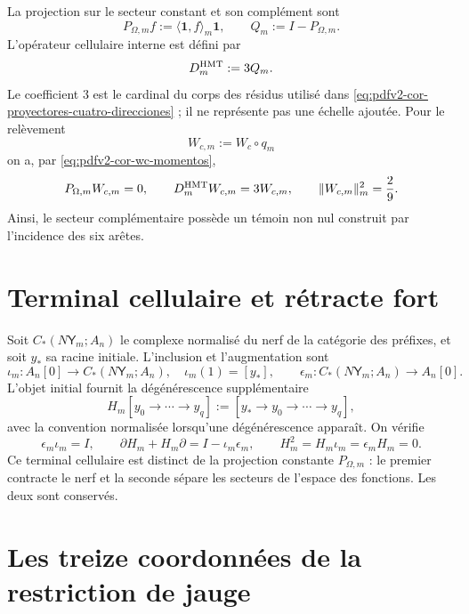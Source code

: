 La projection sur le secteur constant et son complément sont
\begin{equation}\label{eq:gauint-pq}
 P_{\Omega,m}f:=\langle\mathbf1,f\rangle_m\mathbf1,
 \qquad
 Q_m:=I-P_{\Omega,m}.
\end{equation}
L'opérateur cellulaire interne est défini par
\begin{equation}\label{eq:gauint-d-hmt}
 D_m^{\rm HMT}:=3Q_m.
\end{equation}
Le coefficient \(3\) est le cardinal du corps des résidus utilisé dans
\eqref{eq:pdfv2-cor-proyectores-cuatro-direcciones} ; il ne représente pas une
échelle ajoutée.
Pour le relèvement
\[
 W_{c,m}:=W_c\circ q_m
\]
on a, par \eqref{eq:pdfv2-cor-wc-momentos},
\begin{equation}\label{eq:gauint-w-eigen}
 P_{\Omega,m}W_{c,m}=0,
 \qquad
 D_m^{\rm HMT}W_{c,m}=3W_{c,m},
 \qquad
 \|W_{c,m}\|_m^2=\frac29.
\end{equation}
Ainsi, le secteur complémentaire possède un témoin non nul construit par
l'incidence des six arêtes.

\section{Terminal cellulaire et rétracte fort}

Soit \(C_*(N\mathsf Y_m;A_n)\) le complexe normalisé du nerf de la
catégorie des préfixes, et soit \(y_*\) sa racine initiale. L'inclusion et
l'augmentation sont
\[
 \iota_m:A_n[0]\longrightarrow C_*(N\mathsf Y_m;A_n),
 \quad \iota_m(1)=[y_*],
 \qquad
 \epsilon_m:C_*(N\mathsf Y_m;A_n)\longrightarrow A_n[0].
\]
L'objet initial fournit la dégénérescence supplémentaire
\begin{equation}\label{eq:gauint-homotopia-celular}
 H_m[y_0\to\cdots\to y_q]
 :=[y_*\to y_0\to\cdots\to y_q],
\end{equation}
avec la convention normalisée lorsqu'une dégénérescence apparaît. On vérifie
\begin{equation}\label{eq:gauint-sdr}
 \epsilon_m\iota_m=I,
 \qquad
 \partial H_m+H_m\partial=I-\iota_m\epsilon_m,
 \qquad
 H_m^2=H_m\iota_m=\epsilon_mH_m=0.
\end{equation}
Ce terminal cellulaire est distinct de la projection constante
\(P_{\Omega,m}\) : le premier contracte le nerf et la seconde sépare les
secteurs de l'espace des fonctions. Les deux sont conservés.

\iffalse
\section{Les treize coordonnées de la restriction de jauge}

